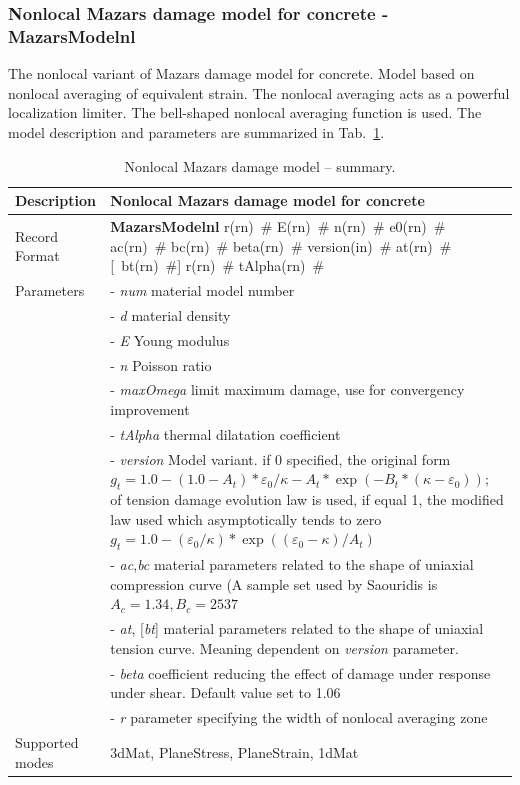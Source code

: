 \documentclass[a4paper]{article}
\newcommand{\descitem}[1]{{\noindent \bf #1}}
\newcommand{\elemparam}[2]{{{#1\tiny (#2)}~\#}}
\newcommand{\optelemparam}[2]{[{~\elemparam{#1}{#2}}]}
\newcommand{\param}[1]{{\it #1}}
\newcommand{\optparam}[1]{[{\it #1}]}
\newenvironment{mmt}{\begin{tabular}{|l|p{9cm}|}}{\end{tabular}\\}
\newenvironment{mmt}{\begin{tabular}{|l|l|}}{\end{tabular}\\}
\begin{document}
\subsubsection{Nonlocal Mazars damage model for concrete - MazarsModelnl}
The nonlocal variant of Mazars damage model for concrete.
Model based on nonlocal averaging of equivalent strain.
The nonlocal averaging acts as a powerful localization
limiter. The bell-shaped nonlocal averaging function is used.
The model description and parameters are summarized
in Tab.~\ref{maznl_table}.

\begin{table}[!htb]
\begin{mmt}
\hline
Description & Nonlocal Mazars damage model for concrete\\
\hline
Record Format & \descitem{MazarsModelnl} \elemparam{r}{rn} \elemparam{E}{rn}
\elemparam{n}{rn}  \elemparam{e0}{rn}
\elemparam{ac}{rn} \elemparam{bc}{rn} \elemparam{beta}{rn}
\elemparam{version}{in} \elemparam{at}{rn} \optelemparam{bt}{rn} \elemparam{r}{rn}
\elemparam{tAlpha}{rn} \\
Parameters &- \param{num} material model number\\
&- \param{d} material density\\
&- \param{E} Young modulus\\
&- \param{n} Poisson ratio\\
&- \param{maxOmega} limit maximum damage, use for convergency improvement\\
&- \param{tAlpha} thermal dilatation coefficient\\
&- \param{version} Model variant. if 0 specified, the original form
$g_t= 1.0-(1.0-A_t)*\varepsilon_0/\kappa - A_t*\exp(-B_t*(\kappa-\varepsilon_0));
$ of
tension damage evolution law is used, if equal 1, the modified law
used which asymptotically tends to zero
$g_t = 1.0-(\varepsilon_0/\kappa)*\exp((\varepsilon_0-\kappa)/A_t)$\\
&- \param{ac},\param{bc} material parameters related to the shape of
uniaxial compression curve (A sample set used by Saouridis is $A_c =
1.34, B_c = 2537$\\
&- \param{at}, \optparam{bt} material parameters related to the shape of
uniaxial tension curve. Meaning dependent on \param{version}
parameter.\\
&- \param{beta} coefficient reducing the effect of damage under
response under shear. Default value set to 1.06\\
&- \param{r} parameter specifying the width of nonlocal averaging zone\\
Supported modes& 3dMat, PlaneStress, PlaneStrain, 1dMat\\
\hline
\end{mmt}
\caption{Nonlocal Mazars damage model  -- summary.}
\label{maznl_table}
\end{table}
\end{document}
